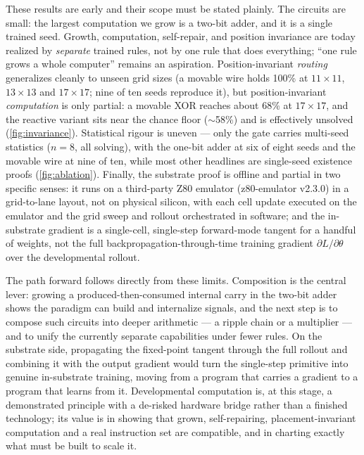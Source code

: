 These results are early and their scope must be stated plainly. The circuits are small: the largest computation we grow is a two-bit adder, and it is a single trained seed. Growth, computation, self-repair, and position invariance are today realized by \emph{separate} trained rules, not by one rule that does everything; ``one rule grows a whole computer'' remains an aspiration. Position-invariant \emph{routing} generalizes cleanly to unseen grid sizes (a movable wire holds 100\% at $11\times11$, $13\times13$ and $17\times17$; nine of ten seeds reproduce it), but position-invariant \emph{computation} is only partial: a movable XOR reaches about 68\% at $17\times17$, and the reactive variant sits near the chance floor ($\sim$58\%) and is effectively unsolved (\ref{fig:invariance}). Statistical rigour is uneven --- only the gate carries multi-seed statistics ($n=8$, all solving), with the one-bit adder at six of eight seeds and the movable wire at nine of ten, while most other headlines are single-seed existence proofs (\ref{fig:ablation}). Finally, the substrate proof is offline and partial in two specific senses: it runs on a third-party Z80 emulator (z80-emulator v2.3.0) in a grid-to-lane layout, not on physical silicon, with each cell update executed on the emulator and the grid sweep and rollout orchestrated in software; and the in-substrate gradient is a single-cell, single-step forward-mode tangent for a handful of weights, not the full backpropagation-through-time training gradient $\partial L/\partial\theta$ over the developmental rollout.

The path forward follows directly from these limits. Composition is the central lever: growing a produced-then-consumed internal carry in the two-bit adder shows the paradigm can build and internalize signals, and the next step is to compose such circuits into deeper arithmetic --- a ripple chain or a multiplier --- and to unify the currently separate capabilities under fewer rules. On the substrate side, propagating the fixed-point tangent through the full rollout and combining it with the output gradient would turn the single-step primitive into genuine in-substrate training, moving from a program that carries a gradient to a program that learns from it. Developmental computation is, at this stage, a demonstrated principle with a de-risked hardware bridge rather than a finished technology; its value is in showing that grown, self-repairing, placement-invariant computation and a real instruction set are compatible, and in charting exactly what must be built to scale it.
